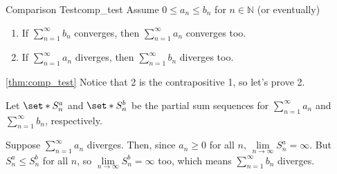 \begin{Theorem}{Comparison Test}{comp_test}
    Assume $ 0\leqslant a_n\leqslant b_n $ for $ n\in\mathbb{N} $ (or eventually)
    \begin{enumerate}[label=(\arabic*)]
        \item If $ \sum\limits_{n=1}^{\infty} b_n $ converges, then
              $ \sum\limits_{n=1}^{\infty} a_n $ converges too.
        \item If $ \sum\limits_{n=1}^{\infty} a_n $ diverges, then
              $ \sum\limits_{n=1}^{\infty} b_n $ diverges too.
    \end{enumerate}
\end{Theorem}
\begin{Proof}{\ref{thm:comp_test}}{}
    Notice that 2 is the contrapositive 1, so let's prove 2.

    Let $ \set*{S_n^a} $ and $ \set*{S_n^b} $ be the partial sum
    sequences for $ \sum\limits_{n=1}^{\infty} a_n $ and $ \sum\limits_{n=1}^{\infty} b_n $,
    respectively.

    Suppose $ \sum\limits_{n=1}^{\infty} a_n $ diverges. Then, since
    $ a_n\geqslant 0 $ for all $ n $, $ \lim\limits_{{n} \to {\infty}} S_n^a =\infty $.
    But $ S_n^a\leqslant S_n^b $ for all $ n $, so $ \lim\limits_{{n} \to {\infty}} S_n^b =\infty $
    too, which means $ \sum\limits_{n=1}^{\infty} b_n $ diverges.
\end{Proof}

